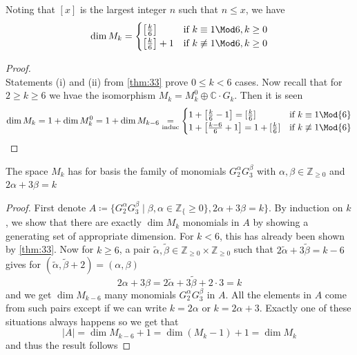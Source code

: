 \documentclass[12pt]{article}
\theoremstyle{definition}
\begin{document}
\begin{cor}
Noting that \([x]\) is the largest integer \(n\) such that \(n\leq  x\), we have  
\[
    \dim M_k = \begin{cases}
        \left[\frac{k}{6}\right] & \text{if } k \equiv 1 \Mod 6, k\geq 0\\
        \left[\frac{k}{6}\right]+1 & \text{if } k \not\equiv 1 \Mod 6, k\geq 0\\
    \end{cases}
\]
\end{cor}
\begin{proof}~\\
Statements (i) and (ii) from \cref{thm:33} prove \(0\leq k<6\) cases. Now recall that for \(2\geq k\geq 6\) we hvae the isomorphism \(M_k = M_k^0 \oplus \mathbb{C} \cdot G_k\). Then it is seen 
\[
    \dim M_k = 1 + \dim M_k^0 = 1+ \dim M_{k-6} \underset{\textrm{induc}}{=} \begin{cases}
        1+ \left[ \frac{k}{6} - 1 \right] = [\frac{k}{6}] & \textrm{if } k \equiv 1 \Mod{6}\\
        1+ \left[ \frac{k-6}{6} +1 \right] = 1+[\frac{k}{6}] & \textrm{if } k \not\equiv 1 \Mod{6}
    \end{cases}
\]   
\end{proof}
\begin{cor}
The space \(M_k\) has for basis the family of monomials \(G_2^\alpha G_3^\beta \) with \(\alpha ,\beta \in \mathbb{Z} _{\geq 0}\) and \(2\alpha +3\beta =k\)   
\end{cor}
\begin{proof}
First denote \(A\coloneqq \{ G_2^\alpha G_3^\beta \mid \beta ,\alpha \in \mathbb{Z}_\{ \geq 0 \}, 2\alpha +3\beta =k  \} \). By induction on \(k\), we show that there are exactly \(\dim M_k\) monomials in \(A\) by showing a generating set of appropriate dimension. For \(k<6\), this has already been shown by \cref{thm:33}. Now for \(k\geq 6\), a pair \(\widetilde{\alpha },\widetilde{\beta }\in \mathbb{Z}_{ \geq 0 }\times \mathbb{Z}_{ \geq 0 }  \) such that \(2\widetilde{\alpha }+3\widetilde{\beta }=k-6  \) gives for \((\widetilde{\alpha }, \widetilde{\beta } +2 ) = (\alpha ,\beta )\) 
\[
    2\alpha +3\beta =2 \widetilde{\alpha }+3 \widetilde{\beta }+2\cdot 3=k  
\]          
and we get \(\dim M_{k-6}\) many monomials \(G_2^\alpha G_3^\beta \) in \(A\).
All the elements in \(A\) come from such pairs except if we can write \(k=2\alpha \) or \(k=2\alpha +3\). Exactly one of these situations always happens so we get that \[\vert A \vert =\dim M_{k-6}+1=\dim (M_k-1)+1=\dim M_k\]  
and thus the result follows    
\end{proof}
\end{document}

